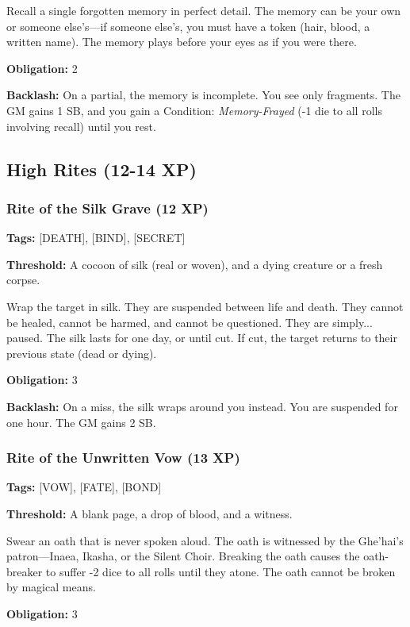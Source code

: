 Recall a single forgotten memory in perfect detail. The memory can be your own or someone else's—if someone else's, you must have a token (hair, blood, a written name). The memory plays before your eyes as if you were there.

\textbf{Obligation:} 2

\textbf{Backlash:} On a partial, the memory is incomplete. You see only fragments. The GM gains 1 SB, and you gain a Condition: \textit{Memory-Frayed} (-1 die to all rolls involving recall) until you rest.

\subsection{High Rites (12-14 XP)}

\subsubsection{Rite of the Silk Grave (12 XP)}

\textbf{Tags:} [DEATH], [BIND], [SECRET]

\textbf{Threshold:} A cocoon of silk (real or woven), and a dying creature or a fresh corpse.

Wrap the target in silk. They are suspended between life and death. They cannot be healed, cannot be harmed, and cannot be questioned. They are simply... paused. The silk lasts for one day, or until cut. If cut, the target returns to their previous state (dead or dying).

\textbf{Obligation:} 3

\textbf{Backlash:} On a miss, the silk wraps around you instead. You are suspended for one hour. The GM gains 2 SB.

\subsubsection{Rite of the Unwritten Vow (13 XP)}

\textbf{Tags:} [VOW], [FATE], [BOND]

\textbf{Threshold:} A blank page, a drop of blood, and a witness.

Swear an oath that is never spoken aloud. The oath is witnessed by the Ghe'hai's patron—Inaea, Ikasha, or the Silent Choir. Breaking the oath causes the oath-breaker to suffer -2 dice to all rolls until they atone. The oath cannot be broken by magical means.

\textbf{Obligation:} 3


